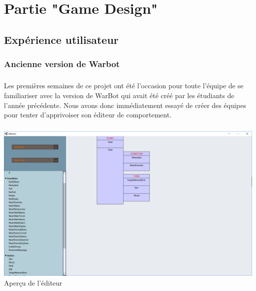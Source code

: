 \documentclass{report}
\begin{document}
\paragraph{}

\newpage
\chapter{Partie "Game Design"}
\section{Expérience utilisateur}
\subsection{Ancienne version de Warbot}
\paragraph{}
    Les premières semaines de ce projet ont été l’occasion pour toute l’équipe de se familiariser avec la version de WarBot qui avait été créé par les étudiants de l’année précédente. Nous avons donc immédiatement essayé de créer des équipes pour tenter d’apprivoiser son éditeur de comportement.
\paragraph{}
\begin{adjustwidth}{-3em}{}
\includegraphics[scale=0.4]{DATA/oldEditor.png}
 {Aperçu de l'éditeur}
\end{adjustwidth}
\end{document}
